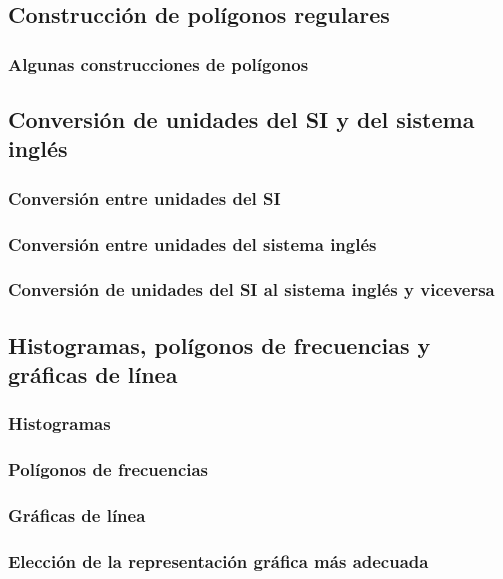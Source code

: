 \documentclass[11pt]{book}
\begin{document}
\newpage \thispagestyle{plain}
\section{Construcción de polígonos regulares}
\subsection{Algunas construcciones de polígonos}

\newpage \thispagestyle{plain}
\section{Conversión de unidades del SI y del sistema inglés}
\subsection{Conversión entre unidades del SI}
\subsection{Conversión entre unidades del sistema inglés}
\subsection{Conversión de unidades del SI al sistema inglés y viceversa}

\newpage \thispagestyle{plain}
\section{Histogramas, polígonos de frecuencias y gráficas de línea}
\subsection{Histogramas}
\subsection{Polígonos de frecuencias}
\subsection{Gráficas de línea}
\subsection{Elección de la representación gráfica más adecuada}
\newpage \thispagestyle{plain}
\chapter{}
\end{document}
